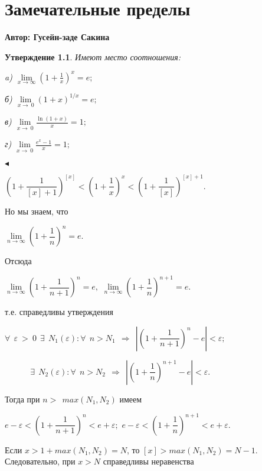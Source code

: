 \documentclass[12pt,titlepage]{report}
\newtheorem{approval}{Утверждение}
\begin{document}
\chapter{Замечательные пределы}
\centerline{ \bf Автор: Гусейн-заде Сакина } \vskip 1cm

\begin{approval}
\slshape{Имеют место соотношения:}

\slshape{a)}
$\lim\limits_{x\to\infty} (1+\frac{1}{x})^{x}=e;$


\slshape{б)}
$\lim\limits_{x\to\ 0}(1+x)^{1/x} =e;$


\slshape{в)}
$\lim\limits_{x\to\ 0}\frac{\ln(1+x)}{x} =1;$


\slshape{г)}
$\lim\limits_{x\to\ 0}\frac{e^{x}-1}{x} =1;$

\end{approval}

$\blacktriangleleft$
 
 \begin{center}
 $
 \left(1+\dfrac{1}{[x]+1}\right) ^{[x]}<\left(1+\dfrac{1}{x}\right) ^{x}<\left(1+\dfrac{1}{[x]}\right) ^{[x]+1}
 $.
 \end{center}
Но мы знаем, что
 
  \begin{center}
  $
\lim\limits_{n\to\infty}\left(1+\dfrac{1}{n}\right) ^{n}=e.
  $
  \end{center}
Отсюда  
   \begin{center}
   $
 \lim\limits_{n\to\infty}\left(1+\dfrac{1}{n+1}\right)^{n}=e, $   $\lim\limits_{n\to\infty}\left(1+\dfrac{1}{n}\right)^{n+1}=e.
   $
   \end{center}
т.е. справедливы утверждения
   \begin{center}
   $
\forall\: \: \varepsilon\: >\: 0   \:\:  \exists \:\:  N_1(\varepsilon ):\forall\: \:  n>N_1 \: \: \Rightarrow \: \:  \left | \left(1+\dfrac{1}{n+1}\right)^{n}-e \right |<\varepsilon ;
   $
   
   $
\:\:\:\:\:\:\:\:\:\:\:\:\:\:  \exists \:\:  N_2(\varepsilon ):\forall\: \:  n>N_2 \: \: \Rightarrow \: \:  \left | \left(1+\dfrac{1}{n}\right)^{n+1}-e \right |<\varepsilon.
   $
\end{center}

Тогда при $n>\:\:max(N_1, N_2)$ имеем

\begin{center}
$e-\varepsilon <\left(1+\dfrac{1}{n+1} \right )^{n}<e+\varepsilon;$
$e-\varepsilon <\left(1+\dfrac{1}{n} \right )^{n+1}<e+\varepsilon.$
\end{center}   
Если $x>1+max(N_1, N_2)=N$, то $[x]>max(N_1, N_2)=N  -  1$.
 Следовательно, при $x>N$ справедливы неравенства
 
\end{document}
